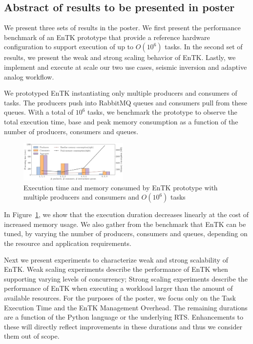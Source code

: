 \subsection{Abstract of results to be presented in poster}

We present three sets of results in the poster. We first present the performance
benchmark of an EnTK prototype that provide a reference hardware configuration 
to support execution of up to $O(10^6)$ tasks. In the second set of results, we
present the weak and strong scaling behavior of EnTK. Lastly, we implement and 
execute at scale our two use cases, seismic inversion and adaptive analog 
workflow.

We prototyped EnTK instantiating only multiple producers and consumers of tasks.
The producers push into RabbitMQ queues and consumers pull from these queues.
With a total of $10^6$ tasks, we benchmark the prototype to observe the total
execution time, base and peak memory consumption as a function of the number of
producers, consumers and queues.

\begin{figure} 
\includegraphics[width=0.48\textwidth]{figs/prototype.pdf}
\caption{Execution time and memory consumed by EnTK prototype with multiple 
producers and consumers and $O(10^6)$ tasks}\label{fig:prototype}
\end{figure}

In Figure~\ref{fig:prototype}, we show that the execution duration decreases
linearly at the cost of increased memory usage. We also gather from the 
benchmark that EnTK can be tuned, by varying the number of producers, consumers 
and queues, depending on the resource and application requirements.


Next we present experiments to characterize weak and strong scalability of EnTK.
Weak scaling experiments describe the performance of EnTK when supporting 
varying levels of concurrency; Strong scaling experiments describe the 
performance of EnTK when executing a workload larger than the amount of 
available resources. For the purposes of the poster, we focus only on the Task
Execution Time and the EnTK Management Overhead. The remaining durations are
a function of the Python language or the underlying RTS. Enhancements to these
will directly reflect improvements in these durations and thus we consider them
out of scope.

